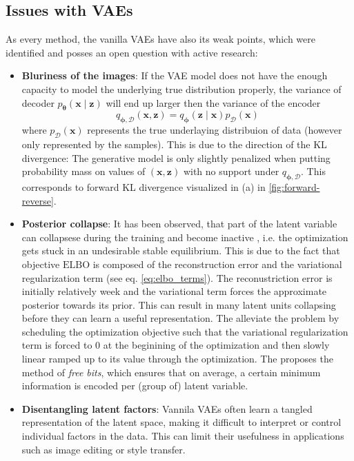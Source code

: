 \subsection{Issues with VAEs}
As every method, the vanilla VAEs have also its weak points, which were identified and posses an open question with active research:
\begin{itemize}
    \item \textbf{Bluriness of the images}: If the VAE model does not have the enough capacity to model the underlying true distribution properly,
    the variance of decoder $p_{\boldsymbol{\theta}}(\boldsymbol{x}\mid \boldsymbol{z})$ will end up larger then the variance of the encoder 
    $$
    q_{\mathbf{\phi},\mathcal{D}}(\boldsymbol{x},\boldsymbol{z}) = q_{\boldsymbol{\phi}}(\mathbf{z}\mid\mathbf{x})p_{\mathcal{D}}(\mathbf{x})
    $$
    where $p_{\mathcal{D}}(\mathbf{x})$ represents the true underlaying distribuion of data (however only represented by the samples).
    This is due to the direction of the KL divergence: The generative model is only slightly penalized when putting probability mass on values 
    of $(\boldsymbol{x},\boldsymbol{z})$ with no support under $q_{\mathbf{\phi},\mathcal{D}}$\cite{intro-vae-2019}. This corresponds to forward KL
    divergence visualized in (a) in \ref{fig:forward-reverse}.

    \item \textbf{Posterior collapse}: It has been observed, that part of the latent variable can collapsese during the training
    and become inactive \cite{lvae-2016,iaf-2016,bowmann-2016}, i.e. the optimization gets stuck in an undesirable stable
    equilibrium. This is due to the fact that objective $\mathrm{ELBO}$ is composed of the reconstruction error
    and the variational regularization term (see eq. \ref{eq:elbo_terms}). The reconustriction error is initially relatively week and 
    the variational term forces the approximate posterior towards its prior. This can result in many latent units collapsing before they 
    can learn a useful representation. 
    The \cite{lvae-2016} alleviate the problem by scheduling the optimization objective such that the variational regularization term is
    forced to 0 at the beginining of the optimization and then slowly linear ramped up to its value through the optimization. The \cite{iaf-2016} 
    proposes the method of \textit{free bits}, which ensures that on average, a certain minimum information is encoded per (group of) 
    latent variable. 
    \item \textbf{Disentangling latent factors}: Vannila VAEs often learn a tangled representation of the latent space, making it
    difficult to interpret or control individual factors in the data. This can limit their usefulness in applications such as 
    image editing or style transfer.
\end{itemize}

